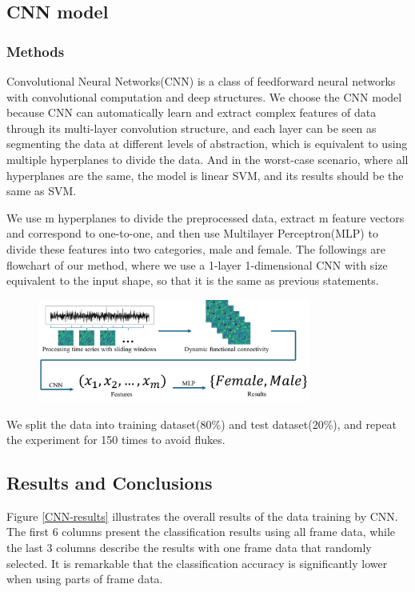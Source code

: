\documentclass[11pt]{article}
\begin{document}
\subsection{CNN model}

\subsubsection{Methods}

Convolutional Neural Networks(CNN) is a class of feedforward neural networks with convolutional computation and deep structures. We choose the CNN model because CNN can automatically learn and extract complex features of data through its multi-layer convolution structure, and each layer can be seen as segmenting the data at different levels of abstraction, which is equivalent to using multiple hyperplanes to divide the data. And in the worst-case scenario, where all hyperplanes are the same, the model is linear SVM, and its results should be the same as SVM.

We use m hyperplanes to divide the preprocessed data, extract m feature vectors and correspond to one-to-one, and then use Multilayer Perceptron(MLP) to divide these features into two categories, male and female. The followings are flowchart of our method, where we use a 1-layer 1-dimensional CNN with size equivalent to the input shape, so that it is the same as previous statements.

\begin{figure}[H]
    \centering
    \includegraphics[width=0.8\textwidth]{./figure/method.png}
    \label{figure-CNN-model}
\end{figure}

We split the data into training dataset(80\%) and test dataset(20\%), and repeat the experiment for 150 times to avoid flukes.

\subsection{Results and Conclusions}

Figure \ref{CNN-results} illustrates the overall results of the data training by CNN. The first 6 columns present the classification results using all frame data, while the last 3 columns describe the results with one frame data that randomly selected. It is remarkable that the classification accuracy is significantly lower when using parts of frame data.
\end{document}
